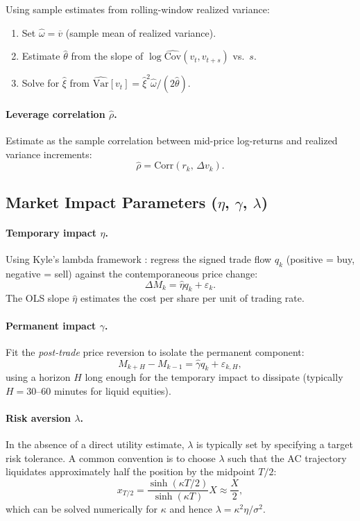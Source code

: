 \documentclass[11pt]{article}
\begin{document}
Using sample estimates from rolling-window realized variance:
\begin{enumerate}[label=(\roman*)]
\item Set $\hat\omega = \overline{v}$ (sample mean of realized variance).
\item Estimate $\hat\theta$ from the slope of $\log\widehat{\mathrm{Cov}}(v_t,v_{t+s})$ vs.\ $s$.
\item Solve for $\hat\xi$ from $\widehat{\mathrm{Var}}[v_t] = \hat\xi^2\hat\omega/(2\hat\theta)$.
\end{enumerate}

\paragraph{Leverage correlation $\hat\rho$.}
Estimate as the sample correlation between mid-price log-returns and realized variance increments:
\[
\hat\rho = \mathrm{Corr}(r_k,\,\Delta v_k).
\]

\subsection{Market Impact Parameters ($\eta$, $\gamma$, $\lambda$)}

\paragraph{Temporary impact $\eta$.}
Using Kyle's lambda framework \cite{kyle1985continuous}: regress the signed trade flow $q_k$ (positive = buy, negative = sell) against the contemporaneous price change:
\[
\Delta M_k = \hat\eta q_k + \varepsilon_k.
\]
The OLS slope $\hat\eta$ estimates the cost per share per unit of trading rate.

\paragraph{Permanent impact $\gamma$.}
Fit the \emph{post-trade} price reversion to isolate the permanent component:
\[
M_{k+H} - M_{k-1} = \hat\gamma q_k + \varepsilon_{k,H},
\]
using a horizon $H$ long enough for the temporary impact to dissipate (typically $H = 30$--$60$ minutes for liquid equities).

\paragraph{Risk aversion $\lambda$.}
In the absence of a direct utility estimate, $\lambda$ is typically set by specifying a target risk tolerance. A common convention is to choose $\lambda$ such that the AC trajectory liquidates approximately half the position by the midpoint $T/2$:
\[
x_{T/2} = \frac{\sinh(\kappa T/2)}{\sinh(\kappa T)}X \approx \frac{X}{2},
\]
which can be solved numerically for $\kappa$ and hence $\lambda = \kappa^2\eta/\sigma^2$.
\end{document}
